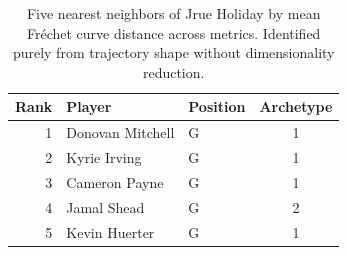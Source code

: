 \begin{table}[htbp]
  \centering\small
  \begin{tabular}{rllc}
    \toprule
    Rank & Player & Position & Archetype \\
    \midrule
    1 & Donovan Mitchell & G & 1 \\
    2 & Kyrie Irving & G & 1 \\
    3 & Cameron Payne & G & 1 \\
    4 & Jamal Shead & G & 2 \\
    5 & Kevin Huerter & G & 1 \\
    \bottomrule
  \end{tabular}
  \caption{Five nearest neighbors of Jrue Holiday by mean Fr\'{e}chet curve distance across metrics. Identified purely from trajectory shape without dimensionality reduction.}
  \label{tab:Jrue_Holiday_frechet_curve_neighbors}
\end{table}


